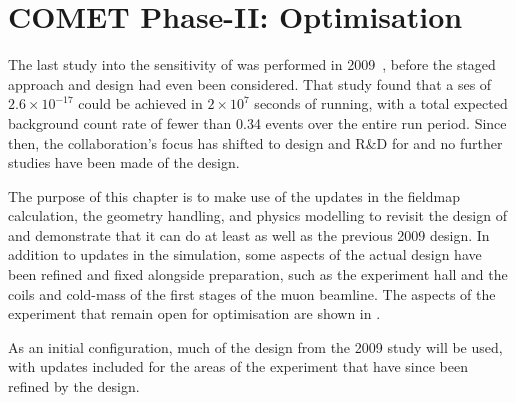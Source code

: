 
\chapter{COMET Phase-II: Optimisation}
The last study into the sensitivity of \COMET \phaseII was performed in 2009~\cite{CDRphase2}, before the staged approach and \phaseI design had even been considered.
That study found that a \ac{ses} of $2.6\times10^{-17}$ could be achieved in $2\times10^{7}$ seconds of running, with a total expected background count rate of fewer than 0.34 events over the entire run period.
Since then, the collaboration's focus has shifted to design and R\&D for \phaseI and no further studies have been made of the \phaseII design.

The purpose of this chapter is to make use of the updates in the fieldmap calculation, the geometry handling, and physics modelling to revisit the design of \phaseII and demonstrate that it can do at least as well as the previous 2009 design.
In addition to updates in the simulation, some aspects of the actual design have been refined and fixed alongside \phaseI preparation, such as the experiment hall and the coils and cold-mass of the first stages of the muon beamline.
The aspects of the experiment that remain open for optimisation are shown in .

As an initial configuration, much of the design from the 2009 study will be used, with updates included for the areas of the experiment that have since been refined by the \phaseI design.
\TabOptimisationParameters%

